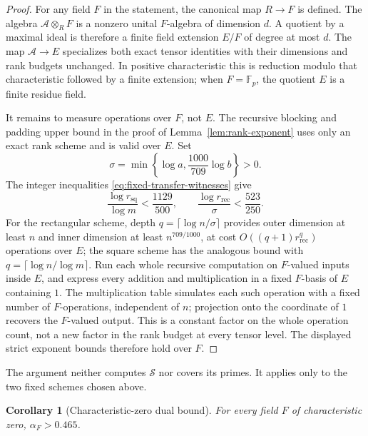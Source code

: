 \documentclass[11pt]{article}
\numberwithin{equation}{section}
\newtheorem{corollary}[theorem]{Corollary}
\theoremstyle{definition}
\theoremstyle{remark}
\begin{document}
\begin{proof}
For any field \(F\) in the statement, the canonical map \(R\to F\)
is defined.  The algebra \(\mathcal A\otimes_R F\) is a nonzero
unital \(F\)-algebra of dimension \(d\).  A quotient by a maximal
ideal is therefore a finite field extension \(E/F\) of degree at
most \(d\).  The map \(\mathcal A\to E\) specializes both exact
tensor identities with their dimensions and rank budgets unchanged.
In positive characteristic this is reduction modulo that
characteristic followed by a finite extension; when \(F=\mathbb F_p\),
the quotient \(E\) is a finite residue field.

It remains to measure operations over \(F\), not \(E\).  The recursive
blocking and padding upper bound in the proof of
Lemma~\ref{lem:rank-exponent} uses only an exact rank scheme and is valid
over \(E\).  Set
\[
 \sigma=\min\left\{\log a,\frac{1000}{709}\log b\right\}>0.
\]
The integer inequalities \eqref{eq:fixed-transfer-witnesses} give
\[
 \frac{\log r_{\mathrm{sq}}}{\log m}<\frac{1129}{500},\qquad
 \frac{\log r_{\mathrm{rec}}}{\sigma}<\frac{523}{250}.
\]
For the rectangular scheme, depth \(q=\lceil\log n/\sigma\rceil\)
provides outer dimension at least \(n\) and inner dimension at least
\(n^{709/1000}\), at cost \(O((q+1)r_{\mathrm{rec}}^q)\) operations
over \(E\); the square scheme has the analogous bound with
\(q=\lceil\log n/\log m\rceil\).
Run each whole recursive computation on \(F\)-valued inputs inside
\(E\), and express every addition and multiplication in a fixed
\(F\)-basis of \(E\) containing \(1\).  The multiplication table
simulates each such operation with a fixed number of \(F\)-operations,
independent of \(n\); projection onto the coordinate of \(1\) recovers
the \(F\)-valued output.  This is a constant factor on the whole
operation count, not a new factor in the rank budget at every tensor
level.  The displayed strict exponent bounds therefore hold over \(F\).
\end{proof}

The argument neither computes \(\mathcal S\) nor covers its primes.
It applies only to the two fixed schemes chosen above.

\begin{corollary}[Characteristic-zero dual bound]\label{cor:characteristic-zero-dual}
For every field \(F\) of characteristic zero, \(\alpha_F>0.465\).
\end{corollary}
\end{document}
